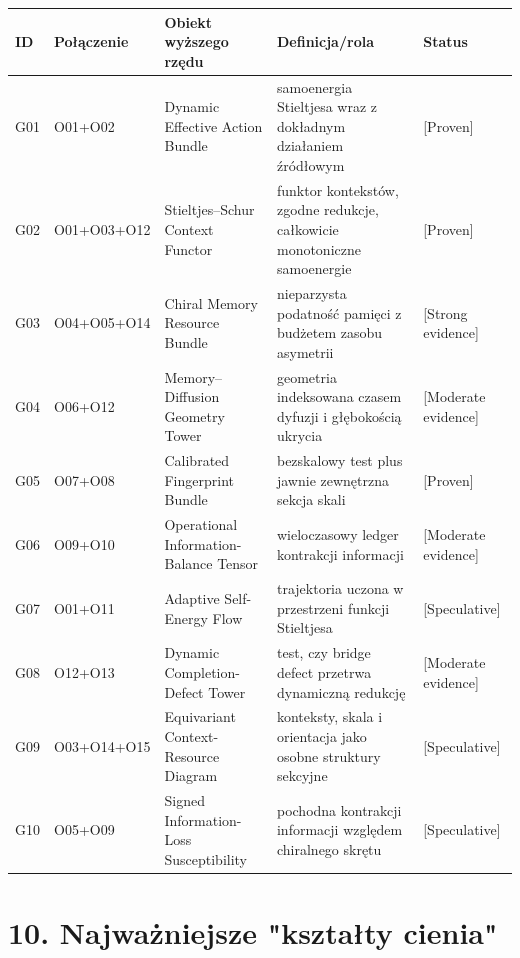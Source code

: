 \documentclass[11pt,a4paper,openany]{report}
\newcommand{\statusProven}{\textcolor{fingreen}{[Proven]}}
\newcommand{\statusStrong}{\textcolor{finblue}{[Strong evidence]}}
\newcommand{\statusModerate}{\textcolor{finviolet}{[Moderate evidence]}}
\newcommand{\statusSpeculative}{\textcolor{finorange}{[Speculative]}}
\begin{document}
\begin{center}
\begingroup\fontsize{7}{8.4}\selectfont
\setlength{\tabcolsep}{2.5pt}
\renewcommand{\arraystretch}{1.16}
\begin{longtable}{@{}p{}p{}p{}p{}p{}@{}}
\toprule
\textbf{ID} & \textbf{Połączenie} & \textbf{Obiekt wy\.zszego rzędu} & \textbf{Definicja/\allowbreak{}rola} & \textbf{Status} \\
\midrule
\endhead
G01 & O01+O02 & Dynamic Effective Action Bundle & samoenergia Stieltjesa wraz z dokładnym działaniem źródłowym & \statusProven{} \\
G02 & O01+O03+O12 & Stieltjes--Schur Context Functor & funktor kontekstów, zgodne redukcje, całkowicie monotoniczne samoenergie & \statusProven{} \\
G03 & O04+O05+O14 & Chiral Memory Resource Bundle & nieparzysta podatność pamięci z bud\.zetem zasobu asymetrii & \statusStrong{} \\
G04 & O06+O12 & Memory--Diffusion Geometry Tower & geometria indeksowana czasem dyfuzji i głębokością ukrycia & \statusModerate{} \\
G05 & O07+O08 & Calibrated Fingerprint Bundle & bezskalowy test plus jawnie zewnętrzna sekcja skali & \statusProven{} \\
G06 & O09+O10 & Operational Information-Balance Tensor & wieloczasowy ledger kontrakcji informacji & \statusModerate{} \\
G07 & O01+O11 & Adaptive Self-Energy Flow & trajektoria uczona w przestrzeni funkcji Stieltjesa & \statusSpeculative{} \\
G08 & O12+O13 & Dynamic Completion-Defect Tower & test, czy bridge defect przetrwa dynamiczną redukcję & \statusModerate{} \\
G09 & O03+O14+O15 & Equivariant Context-Resource Diagram & konteksty, skala i orientacja jako osobne struktury sekcyjne & \statusSpeculative{} \\
G10 & O05+O09 & Signed Information-Loss Susceptibility & pochodna kontrakcji informacji względem chiralnego skrętu & \statusSpeculative{} \\
\bottomrule
\end{longtable}
\endgroup
\end{center}

\chapter{10. Najwa\.zniejsze "kształty cienia"}
\end{document}
